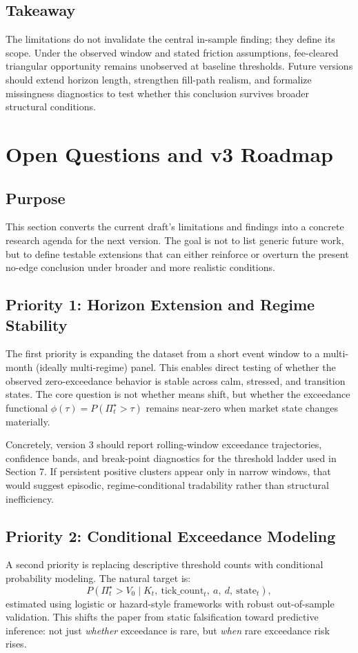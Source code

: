 \documentclass[11pt,a4paper]{article}
\begin{document}
\subsection{Takeaway}
The limitations do not invalidate the central in-sample finding; they define its scope. Under the observed window and stated friction assumptions, fee-cleared triangular opportunity remains unobserved at baseline thresholds. Future versions should extend horizon length, strengthen fill-path realism, and formalize missingness diagnostics to test whether this conclusion survives broader structural conditions.

\section{Open Questions and v3 Roadmap}
\subsection{Purpose}
This section converts the current draft's limitations and findings into a concrete research agenda for the next version. The goal is not to list generic future work, but to define testable extensions that can either reinforce or overturn the present no-edge conclusion under broader and more realistic conditions.

\subsection{Priority 1: Horizon Extension and Regime Stability}
The first priority is expanding the dataset from a short event window to a multi-month (ideally multi-regime) panel. This enables direct testing of whether the observed zero-exceedance behavior is stable across calm, stressed, and transition states. The core question is not whether means shift, but whether the exceedance functional $\phi(\tau)=P(\Pi^\star_t>\tau)$ remains near-zero when market state changes materially.

Concretely, version 3 should report rolling-window exceedance trajectories, confidence bands, and break-point diagnostics for the threshold ladder used in Section 7. If persistent positive clusters appear only in narrow windows, that would suggest episodic, regime-conditional tradability rather than structural inefficiency.

\subsection{Priority 2: Conditional Exceedance Modeling}
A second priority is replacing descriptive threshold counts with conditional probability modeling. The natural target is:
\begin{equation}
P(\Pi^\star_t > V_0 \mid K_t,\ \text{tick\_count}_t,\ a,\ d,\ \text{state}_t),
\end{equation}
estimated using logistic or hazard-style frameworks with robust out-of-sample validation. This shifts the paper from static falsification toward predictive inference: not just \emph{whether} exceedance is rare, but \emph{when} rare exceedance risk rises.
\end{document}
